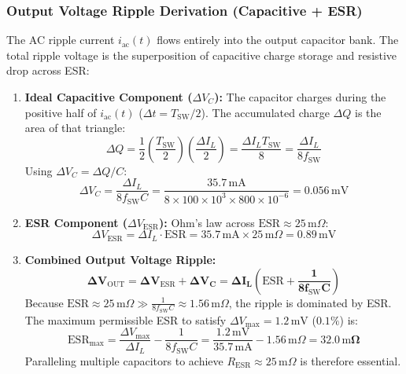 \documentclass[11pt,a4paper]{article}
\begin{document}
\subsubsection{Output Voltage Ripple Derivation (Capacitive + ESR)}
The AC ripple current $i_{\mathrm{ac}}(t)$ flows entirely into the output capacitor bank. The total ripple voltage is the superposition of capacitive charge storage and resistive drop across ESR:
\begin{enumerate}
    \item \textbf{Ideal Capacitive Component ($\Delta V_C$):} The capacitor charges during the positive half of $i_{\mathrm{ac}}(t)$ ($\Delta t = T_{\mathrm{SW}}/2$). The accumulated charge $\Delta Q$ is the area of that triangle:
    \begin{equation}
        \Delta Q = \frac{1}{2} \left(\frac{T_{\mathrm{SW}}}{2}\right) \left(\frac{\Delta I_L}{2}\right) = \frac{\Delta I_L T_{\mathrm{SW}}}{8} = \frac{\Delta I_L}{8 f_{\mathrm{SW}}}
    \end{equation}
    Using $\Delta V_C = \Delta Q / C$:
    \begin{equation}
        \Delta V_C = \frac{\Delta I_L}{8 f_{\mathrm{SW}} C} = \frac{35.7\,\mathrm{mA}}{8 \times 100 \times 10^3 \times 800 \times 10^{-6}} = \mathbf{0.056\,\mathrm{mV}}
    \end{equation}
    \item \textbf{ESR Component ($\Delta V_{\mathrm{ESR}}$):} Ohm's law across $\mathrm{ESR} \approx 25\,\mathrm{m}\Omega$:
    \begin{equation}
        \Delta V_{\mathrm{ESR}} = \Delta I_L \cdot \mathrm{ESR} = 35.7\,\mathrm{mA} \times 25\,\mathrm{m}\Omega = \mathbf{0.89\,\mathrm{mV}}
    \end{equation}
    \item \textbf{Combined Output Voltage Ripple:}
    \begin{equation}
        \mathbf{\Delta V_{\mathrm{OUT}} = \Delta V_{\mathrm{ESR}} + \Delta V_C = \Delta I_L \left(\mathrm{ESR} + \frac{1}{8 f_{\mathrm{SW}} C}\right)}
    \end{equation}
    Because $\mathrm{ESR} \approx 25\,\mathrm{m}\Omega \gg \frac{1}{8 f_{\mathrm{SW}} C} \approx 1.56\,\mathrm{m}\Omega$, the ripple is dominated by ESR. The maximum permissible ESR to satisfy $\Delta V_{\mathrm{max}} = 1.2\,\mathrm{mV}$ ($0.1\%$) is:
    \begin{equation}
        \mathrm{ESR}_{\mathrm{max}} = \frac{\Delta V_{\mathrm{max}}}{\Delta I_L} - \frac{1}{8 f_{\mathrm{SW}} C} = \frac{1.2\,\mathrm{mV}}{35.7\,\mathrm{mA}} - 1.56\,\mathrm{m}\Omega = \mathbf{32.0\,\mathrm{m}\Omega}
    \end{equation}
    Paralleling multiple capacitors to achieve $R_{\mathrm{ESR}} \approx 25\,\mathrm{m}\Omega$ is therefore essential.
\end{enumerate}
\end{document}
